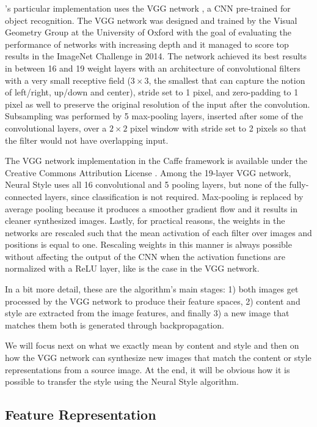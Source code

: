 \citeauthor{Gatys2015B}'s particular implementation uses the VGG network \cite{Simonyan2014}, a CNN pre-trained for object recognition.
The VGG network was designed and trained by the Visual Geometry Group at the University of Oxford with the goal of evaluating the performance of networks with increasing depth and it managed to score top results in the ImageNet Challenge in 2014.
The network achieved its best results in between 16 and 19 weight layers with an architecture of convolutional filters with a very small receptive field (${3}\times{3}$, the smallest that can capture the notion of left/right, up/down and center), stride set to 1 pixel, and zero-padding to 1 pixel as well to preserve the original resolution of the input after the convolution.
Subsampling was performed by 5 max-pooling layers, inserted after some of the convolutional layers, over a ${2}\times{2}$ pixel window with stride set to 2 pixels so that the filter would not have overlapping input.

The VGG network implementation in the Caffe framework is available under the Creative Commons Attribution License \cite{Simonyan2014web}.
Among the 19-layer VGG network, Neural Style uses all 16 convolutional and 5 pooling layers, but none of the fully-connected layers, since classification is not required.
Max-pooling is replaced by average pooling because it produces a smoother gradient flow \cite{Boureau2010} and it results in cleaner synthesized images.
Lastly, for practical reasons, the weights in the networks are rescaled such that the mean activation of each filter over images and positions is equal to one.
Rescaling weights in this manner is always possible without affecting the output of the CNN when the activation functions are normalized with a ReLU layer, like is the case in the VGG network.

In a bit more detail, these are the algorithm's main stages: 1) both images get processed by the VGG network to produce their feature spaces, 2) content and style are extracted from the image features, and finally 3) a new image that matches them both is generated through backpropagation.

We will focus next on what we exactly mean by content and style and then on how the VGG network can synthesize new images that match the content or style representations from a source image.
At the end, it will be obvious how it is possible to transfer the style using the Neural Style algorithm.


\subsection{Feature Representation}
\label{sub:system:method:representations}

